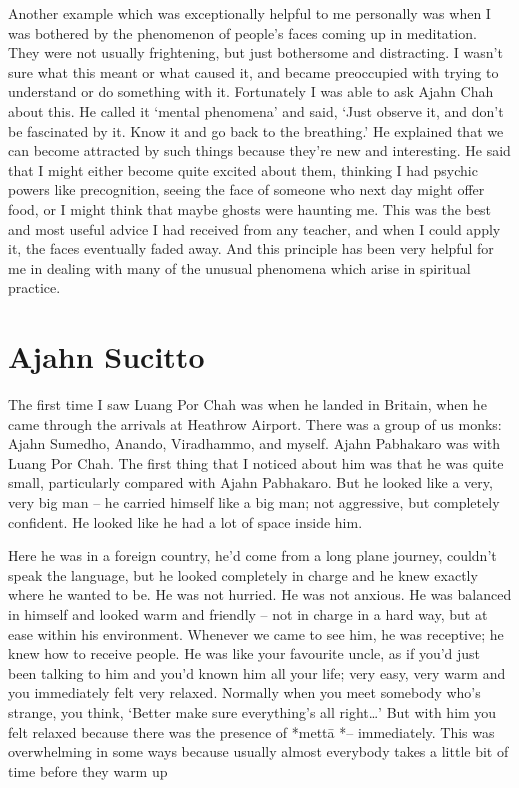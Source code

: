 Another example which was exceptionally helpful to me personally was
when I was bothered by the phenomenon of people's faces coming up in
meditation. They were not usually frightening, but just bothersome and
distracting. I wasn't sure what this meant or what caused it, and became
preoccupied with trying to understand or do something with it.
Fortunately I was able to ask Ajahn Chah about this. He called it
`mental phenomena' and said, `Just observe it, and don't be fascinated
by it. Know it and go back to the breathing.' He explained that we can
become attracted by such things because they're new and interesting. He
said that I might either become quite excited about them, thinking I had
psychic powers like precognition, seeing the face of someone who next
day might offer food, or I might think that maybe ghosts were haunting
me. This was the best and most useful advice I had received from any
teacher, and when I could apply it, the faces eventually faded away. And
this principle has been very helpful for me in dealing with many of the
unusual phenomena which arise in spiritual practice.

\section{Ajahn Sucitto}

The first time I saw Luang Por Chah was when he landed in Britain, when
he came through the arrivals at Heathrow Airport. There was a group of
us monks: Ajahn Sumedho, Anando, Viradhammo, and myself. Ajahn Pabhakaro
was with Luang Por Chah. The first thing that I noticed about him was
that he was quite small, particularly compared with Ajahn Pabhakaro. But
he looked like a very, very big man -- he carried himself like a big
man; not aggressive, but completely confident. He looked like he had a
lot of space inside him.

Here he was in a foreign country, he'd come from a long plane journey,
couldn't speak the language, but he looked completely in charge and he
knew exactly where he wanted to be. He was not hurried. He was not
anxious. He was balanced in himself and looked warm and friendly -- not
in charge in a hard way, but at ease within his environment. Whenever we
came to see him, he was receptive; he knew how to receive people. He was
like your favourite uncle, as if you'd just been talking to him and
you'd known him all your life; very easy, very warm and you immediately
felt very relaxed. Normally when you meet somebody who's strange, you
think, `Better make sure everything's all right\ldots{}' But with him
you felt relaxed because there was the presence of *mettā *--
immediately. This was overwhelming in some ways because usually almost
everybody takes a little bit of time before they warm up

